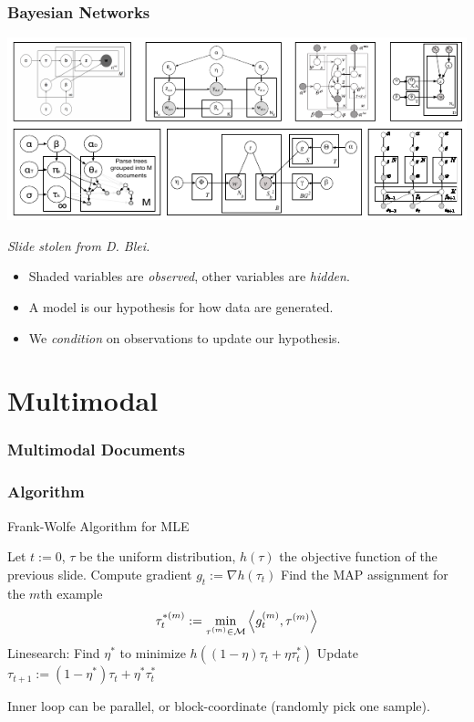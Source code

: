 \documentclass{beamer}
\begin{document}
\begin{frame}
  \frametitle{Bayesian Networks}
  {\centering \includegraphics[width=\textwidth]{assets/lda_crazy.pdf}}
  {\small \emph{Slide stolen from D. Blei.} \par}
  \begin{itemize}
  \item Shaded variables are \emph{observed}, other variables are \emph{hidden}.
  \item A model is our hypothesis for how data are generated.
  \item We \emph{condition} on observations to update our hypothesis.
  \end{itemize}
\end{frame}


\section{Multimodal}
\begin{frame}
  \frametitle{Multimodal Documents}
\end{frame}

\begin{frame}
  \frametitle{Algorithm}
  \begin{algorithm}[H]
      \caption{Frank-Wolfe Algorithm for MLE}
    \begin{algorithmic}
      \State Let $t := 0$, $\tau$ be the uniform distribution, $h(\tau)$ the objective function of the previous slide.
      \Repeat
        \State Compute gradient $g_t := \nabla h(\tau_t)$
          \State Find the MAP assignment for the $m$th example $$\tau_{t}^{*(m)}:=\min_{\tau^{(m)}\in{\cal M}}\left\langle g^{(m)}_t,\tau^{(m)}\right\rangle$$
        \EndFor
        \State Linesearch: Find $\eta^{*}$ to minimize $h((1 - \eta)\tau_t + \eta\tau_{t}^{*})$
        \State Update $\tau_{t+1} := (1 - \eta^{*})\tau_t + \eta^{*}\tau_{t}^{*}$
       
    \end{algorithmic}
  \end{algorithm}
  Inner loop can be parallel, or block-coordinate (randomly pick one sample).
\end{frame}
\end{document}
